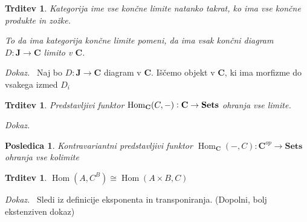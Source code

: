 \documentclass[12pt,a4paper]{book}
\theoremstyle{definition}
\theoremstyle{plain}
\newtheorem{trditev}[definicija]{Trditev}
\newtheorem{posledica}{Posledica}[definicija]
\newenvironment{dokaz}{\emph{Dokaz.}\ }{\hspace{\fill}{$\Box$}}
\theoremstyle{definition}
\theoremstyle{remark}
\newcommand{\cat}[1]{\textbf{#1}}
\DeclareMathOperator{\Hom}{Hom}
\begin{document}
\begin{trditev}
Kategorija ime vse \textit{končne limite} natanko takrat, ko ima vse končne produkte in zožke.

To da ima kategorija končne limite pomeni, da ima vsak končni diagram $D : \cat{J} \to \cat{C}$ limito v $\cat{C}$.

\end{trditev}
\begin{dokaz}
Naj bo $D : \cat{J} \to \cat{C}$ diagram v $\cat{C}$. Iščemo objekt v $\cat{C}$, ki ima morfizme do vsakega izmed $D_i$ 
\end{dokaz} 
 
\begin{trditev} Predstavljivi funktor $\Hom_{\bf{C}}(C,-): \bf{C} \to \bf{Sets}$ ohranja vse limite.
\end{trditev}
\begin{dokaz}

\end{dokaz}

\begin{posledica}
Kontravariantni predstavljivi funktor $\Hom_\cat{C}(-,C) : \cat{C}^{op} \to \cat{Sets}$ ohranja vse kolimite
\end{posledica}

\begin{trditev}
$\Hom(A, C^B) \cong \Hom(A \times B, C)$
\end{trditev}
\begin{dokaz}
Sledi iz definicije eksponenta in transponiranja. (Dopolni, bolj ekstenziven dokaz)
\end{dokaz}
\end{document}
